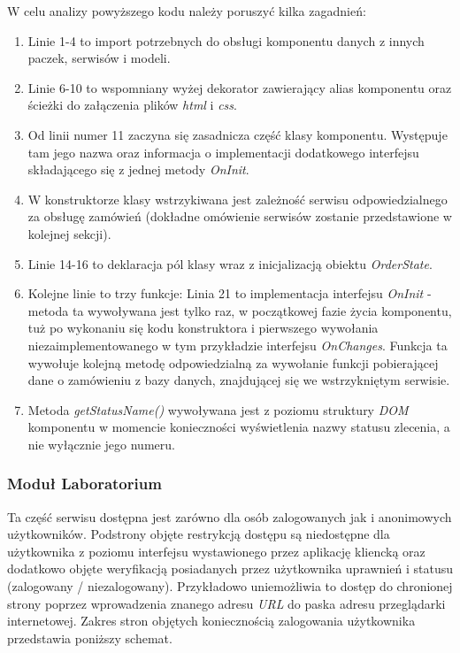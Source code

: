 \noindent W celu analizy powyższego kodu należy poruszyć kilka zagadnień:
\begin{enumerate}
    \item Linie 1-4 to import potrzebnych do obsługi komponentu danych z innych paczek, serwisów i modeli.
    \item Linie 6-10 to wspomniany wyżej dekorator zawierający alias komponentu oraz ścieżki do załączenia plików \textit{html} i \textit{css}.
    \item Od linii numer 11 zaczyna się zasadnicza część klasy komponentu. Występuje tam jego nazwa oraz informacja o implementacji dodatkowego interfejsu składającego się z jednej metody \textit{OnInit}.
    \item W konstruktorze klasy wstrzykiwana jest zależność serwisu odpowiedzialnego za obsługę zamówień (dokładne omówienie serwisów zostanie przedstawione w kolejnej sekcji).
    \item Linie 14-16 to deklaracja pól klasy wraz z inicjalizacją obiektu \textit{OrderState}.
    \item Kolejne linie to trzy funkcje: Linia 21 to implementacja interfejsu \textit{OnInit} - metoda ta wywoływana jest tylko raz, w początkowej fazie życia komponentu, tuż po wykonaniu się kodu konstruktora i pierwszego wywołania niezaimplementowanego w tym przykładzie interfejsu \textit{OnChanges}. Funkcja ta wywołuje kolejną metodę odpowiedzialną za wywołanie funkcji pobierającej dane o zamówieniu z bazy danych, znajdującej się we wstrzykniętym serwisie.
    \item Metoda \textit{getStatusName()} wywoływana jest z poziomu struktury \textit{DOM} komponentu w momencie konieczności wyświetlenia nazwy statusu zlecenia, a nie wyłącznie jego numeru.
\end{enumerate}
\subsubsection{Moduł Laboratorium}

\quad Ta część serwisu dostępna jest zarówno dla osób zalogowanych jak i anonimowych użytkowników. Podstrony objęte restrykcją dostępu są niedostępne dla użytkownika z poziomu interfejsu wystawionego przez aplikację kliencką oraz dodatkowo objęte weryfikacją posiadanych przez użytkownika uprawnień i statusu (zalogowany / niezalogowany). Przykładowo uniemożliwia to dostęp do chronionej strony poprzez wprowadzenia znanego adresu \textit{URL} do paska adresu przeglądarki internetowej. Zakres stron objętych koniecznością zalogowania użytkownika przedstawia poniższy schemat.

